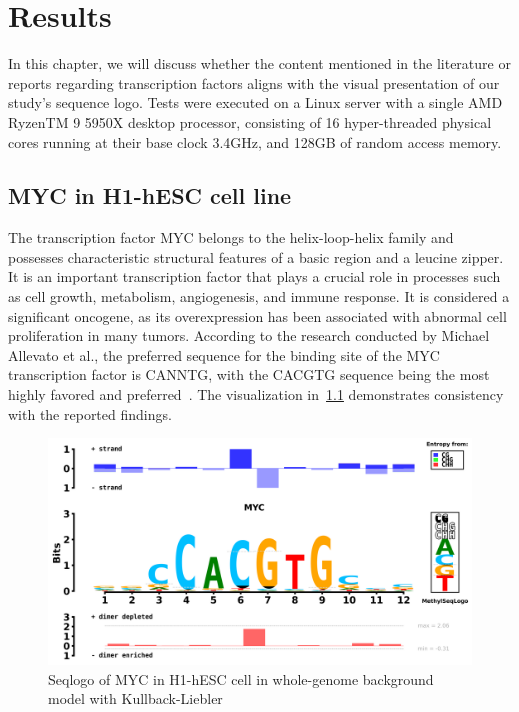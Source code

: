 \documentclass{PHlab-thesis}
\begin{document}
\chapter{Results} 
In this chapter, we will discuss whether the content mentioned in the literature or reports regarding transcription factors aligns with the visual presentation of our study's sequence logo. Tests were executed on a Linux server with a single AMD RyzenTM 9 5950X desktop processor, consisting of 16 hyper-threaded physical cores running at their base clock 3.4GHz, and 128GB of random access memory.
\section{MYC in H1-hESC cell line}
The transcription factor MYC belongs to the helix-loop-helix family and possesses characteristic structural features of a basic region and a leucine zipper. It is an important transcription factor that plays a crucial role in processes such as cell growth, metabolism, angiogenesis, and immune response. It is considered a significant oncogene, as its overexpression has been associated with abnormal cell proliferation in many tumors. According to the research conducted by Michael Allevato et al., the preferred sequence for the binding site of the MYC transcription factor is CANNTG, with the CACGTG sequence being the most highly favored and preferred~\cite{allevato2017sequence}. The visualization in~\ref{fig:MYC} demonstrates consistency with the reported findings.
\begin{figure}[H]
	\centering	
	\includegraphics[scale=0.4]{figures/yulingMYC.png}
	\caption{Seqlogo of MYC in H1-hESC cell in whole-genome background model with Kullback-Liebler}
	\label{fig:MYC} 
\end{figure}
\end{document}
